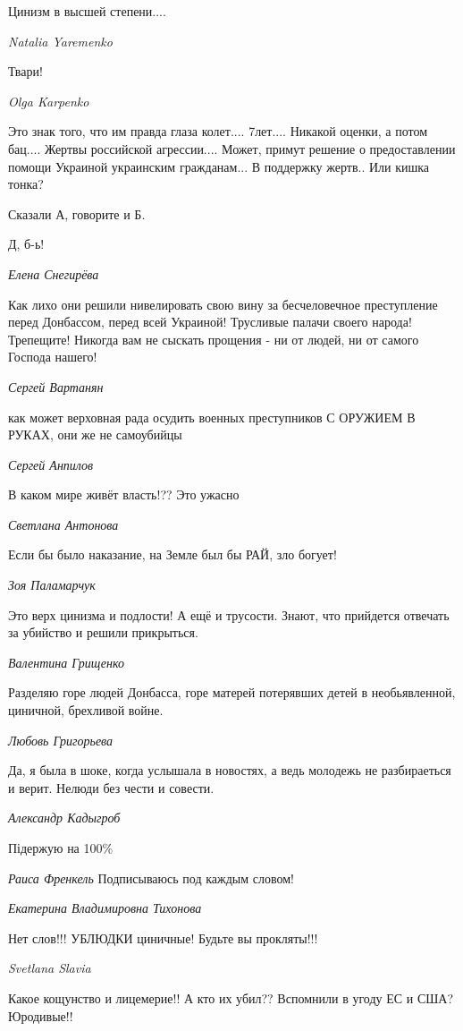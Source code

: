 Цинизм в высшей степени....

\emph{Natalia Yaremenko}

Твари!

\emph{Olga Karpenko}

Это знак того, что им правда глаза колет.... 7лет.... Никакой оценки, а потом
бац.... Жертвы российской агрессии....  Может, примут решение о предоставлении
помощи Украиной украинским гражданам... В поддержку жертв..  Или кишка тонка?

Сказали А, говорите и Б.

Д, б-ь!

\emph{Елена Снегирёва}

Как лихо они решили нивелировать свою вину за бесчеловечное преступление перед
Донбассом, перед всей Украиной! Трусливые палачи своего народа! Трепещите!
Никогда вам не сыскать прощения - ни от людей, ни от самого Господа нашего!

\emph{Сергей Вартанян}

как может верховная рада осудить военных преступников С ОРУЖИЕМ В РУКАХ, они же не самоубийцы

\emph{Сергей Анпилов}

В каком мире живёт власть!?? Это ужасно

\emph{Светлана Антонова}

Если бы было наказание, на Земле был бы РАЙ, зло богует!

\emph{Зоя Паламарчук}

Это верх цинизма и подлости!  А ещё и трусости.  Знают, что прийдется отвечать
за убийство и решили прикрыться.

\emph{Валентина Грищенко}

Разделяю горе людей Донбасса, горе матерей потерявших детей в необьявленной,
циничной, брехливой войне.

\emph{Любовь Григорьева}

Да, я была в шоке, когда услышала в новостях, а ведь молодежь не разбираеться и верит. Нелюди без чести и совести.

\emph{Александр Кадыгроб}

Підержую на 100\%

\emph{Раиса Френкель}
Подписываюсь под каждым словом!

\emph{Екатерина Владимировна Тихонова}

Нет слов!!! УБЛЮДКИ циничные! Будьте вы прокляты!!!

\emph{Svetlana Slavia}

Какое кощунство и лицемерие!! А кто их убил?? Вспомнили в угоду ЕС и США? Юродивые!!

